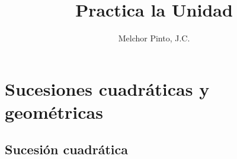 \documentclass[12pt,addpoints]{repaso}
\title{Practica la Unidad}
\author{Melchor Pinto, J.C.}
\begin{document}
\INFO
\begin{multicols}{2}
	\tableofcontents
\end{multicols}
\vfill
\begin{multicols}{2}
    
    \vspace*{2\baselineskip}
    
    
\end{multicols}
\section{Sucesiones cuadráticas y geométricas}
\subsection{Sucesión cuadrática}
\end{document}
